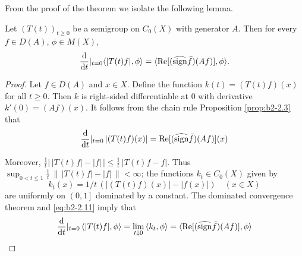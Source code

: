 From the proof of the theorem we isolate the following lemma.

\begin{lemma}\label{lem:b2-2.6}
Let $(T(t))_{t \geq 0}$ be a semigroup on $C_{0}(X)$ with generator $A$.
Then for every $f \in D(A)$, $\phi \in M(X)$,
\begin{equation}\label{eq:b2-2.10}
\frac{\mathrm{d}}{\mathop{}\!\mathrm{d}{t}}
|_{t = 0} \langle |T(t)f|,\phi \rangle = \langle \mathop{}\!\mathrm{Re}[(\widehat{\operatorname{sign}} \bar{f})(Af)],\phi \rangle.
\end{equation}
\end{lemma}

\begin{proof}
Let $f \in D(A)$ and $x \in X$.
Define the function $k(t) = (T(t)f)(x)$ for all $t \geq 0$.
Then $k$ is right-sided differentiable at $0$ with derivative $k'(0) = (Af)(x)$.
It follows from the chain rule Proposition \ref{prop:b2-2.3} that
\begin{equation}\label{eq:b2-2.11}
\frac{\mathop{}\!\mathrm{d}{}}{\mathop{}\!\mathrm{d}{t}}
|_{t = 0}\, |(T(t)f)(x)| = \mathop{}\!\mathrm{Re}[(\widehat{\operatorname{sign}} \bar{f})(Af)](x)
\end{equation}

Moreover, $\frac{1}{t} \left|\, |T(t)f| - |f| \, \right| \leq \frac{1}{t}\, |T(t)f - f|$.
Thus $\sup_{0 < t \leq 1} \frac{1}{t}\, \|\, |T(t)f| - |f|\, \| < \infty$; \ie  the functions $k_{t} \in C_{0}(X)$ given by
\begin{equation}\label{eq:b2-2.12}
k_{t}(x) = 1/t\,(|(T(t)f)(x)| - |f(x)|) \quad (x \in X)
\end{equation}
are uniformly on $\left(0,1\right]$ dominated by a constant.
The dominated convergence theorem and \eqref{eq:b2-2.11} imply that
\begin{align*}
\frac{\mathop{}\!\mathrm{d}{}}{\mathop{}\!\mathrm{d}{t}}|_{t=0}\, \langle |T(t)f|,\phi \rangle = \lim_{t \downarrow 0}\, \langle k_{t},\phi \rangle = \langle \mathop{}\!\mathrm{Re}[(\widehat{\operatorname{sign}} \bar{f})(Af)],\phi \rangle
\end{align*}
\end{proof}

